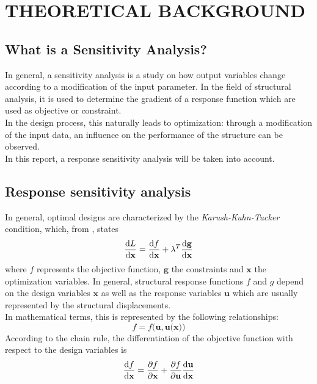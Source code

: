 \section{THEORETICAL BACKGROUND}
\subsection{What is a Sensitivity Analysis?}
In general, a sensitivity analysis is a study on how output variables change according to a modification of the input parameter. In the field of structural analysis, it is used to determine the gradient of a response function which are used as objective or constraint. \\[3pt]
In the design process, this naturally leads to optimization: through a modification of the input data, an influence on the performance of the structure can be observed. \\[3pt]
In this report, a response sensitivity analysis will be taken into account.\\

\subsection{Response sensitivity analysis}
In general, optimal designs are characterized by the \textit{Karush-Kuhn-Tucker} condition, which, from \cite{optimization_Bletzinger}, states
\begin{equation}
\dv{L}{\textbf{x}} = \dv{f}{\textbf{x}} + \lambda^T  \dv{\textbf{g}}{\textbf{x}} 
\end{equation}
where $f$ represents the objective function, $\textbf{g}$ the constraints and $\textbf{x}$ the optimization variables.
In general, structural response functions $f$ and $g$ depend on the design variables $\textbf{x}$ as well as the response variables $\textbf{u}$ which are usually represented by the structural displacements. \\
In mathematical terms, this is represented by the following relationships: 
\begin{equation}
f = f \big(\textbf{u}, \textbf{u(x)}\big)
\end{equation}
According to the chain rule, the differentiation of the objective function with respect to the design variables is
\begin{equation}
\dv{f}{\textbf{x}} = \pdv{f}{\textbf{x}} + \pdv{f}{\textbf{u}} \dv{\textbf{u}}{\textbf{x}}
\end{equation}


